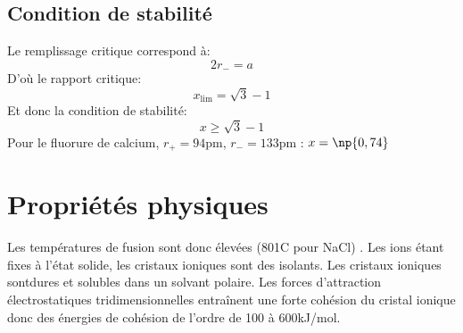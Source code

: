 \subsection{Condition de stabilité}
Le remplissage critique correspond à:
\begin{equation}
    2r_- = a
    \label{eq:3_caf2_lim_r-a}
\end{equation}
D'où le rapport critique:
\begin{equation}
    x_\text{lim} = \sqrt{3} - 1
    \label{eq:3_caf2_xlim}
\end{equation}
Et donc la condition de stabilité:
\begin{equation}
    \boxed{x \geq \sqrt{3} - 1}
    \label{eq:3_caf2_stabx}
\end{equation}
Pour le fluorure de calcium, $r_+ = 94$pm, $r_- = 133$pm :
$x = \np{0,74}$


\section{Propriétés physiques}
Les températures de fusion sont donc élevées (801\degre C pour NaCl)
 .
Les ions étant fixes à l'état solide, les cristaux ioniques sont des isolants.
 Les cristaux ioniques sontdures et solubles
dans un solvant polaire. Les forces d’attraction électrostatiques
tridimensionnelles entraînent une forte cohésion du cristal ionique donc des 
énergies de cohésion de l’ordre de 100 à 600kJ/mol.
